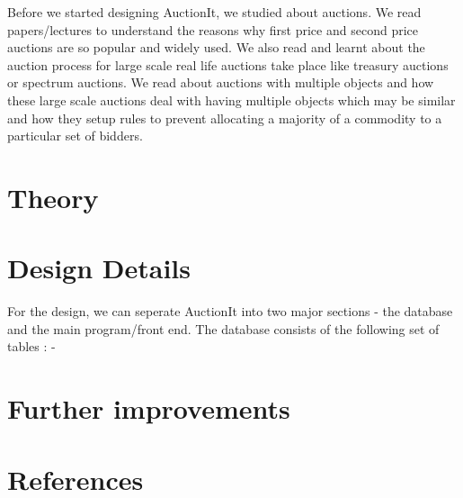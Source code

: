 \documentclass[a4paper]{article}
\begin{document}
Before we started designing AuctionIt, we studied about auctions. We read papers/lectures to understand the reasons why first price and second price auctions are so popular and widely used. We also read and learnt about the auction process for large scale real life auctions take place like treasury auctions or spectrum auctions. We read about auctions with multiple objects and how these large scale auctions deal with having multiple objects which may be similar and how they setup rules to prevent allocating a majority of a commodity to a particular set of bidders.
\section*{Theory}

\section*{Design Details}
For the design, we can seperate AuctionIt into two major sections -  the database and the main program/front end. The database consists of the following set of tables : - 
\section*{Further improvements}

\section*{References}
\end{document}
